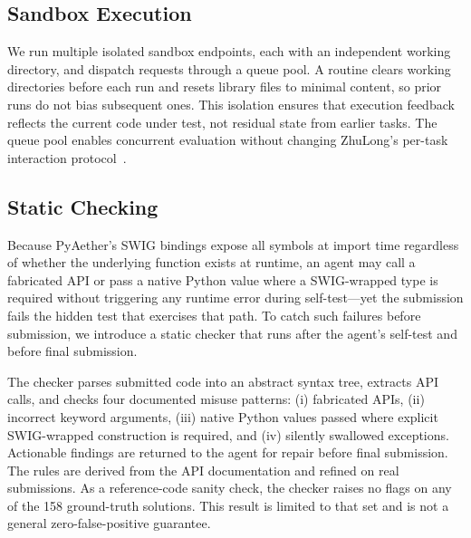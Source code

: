 \subsection{Sandbox Execution}
\label{sec:method_sandbox}

We run multiple isolated sandbox endpoints, each with an independent working directory, and dispatch requests through a queue pool. A routine clears working directories before each run and resets library files to minimal content, so prior runs do not bias subsequent ones. This isolation ensures that execution feedback reflects the current code under test, not residual state from earlier tasks. The queue pool enables concurrent evaluation without changing ZhuLong's per-task interaction protocol~\cite{liu2026zhulong}.

\subsection{Static Checking}
\label{sec:method_checker}

Because PyAether's SWIG bindings expose all symbols at import time regardless of whether the underlying function exists at runtime, an agent may call a fabricated API or pass a native Python value where a SWIG-wrapped type is required without triggering any runtime error during self-test—yet the submission fails the hidden test that exercises that path. To catch such failures before submission, we introduce a static checker that runs after the agent's self-test and before final submission.

The checker parses submitted code into an abstract syntax tree, extracts API calls, and checks four documented misuse patterns: (i) fabricated APIs, (ii) incorrect keyword arguments, (iii) native Python values passed where explicit SWIG-wrapped construction is required, and (iv) silently swallowed exceptions. Actionable findings are returned to the agent for repair before final submission. The rules are derived from the API documentation and refined on real submissions. As a reference-code sanity check, the checker raises no flags on any of the 158 ground-truth solutions. This result is limited to that set and is not a general zero-false-positive guarantee.


